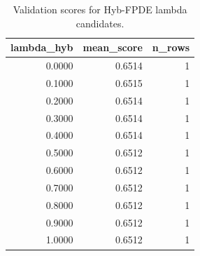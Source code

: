 \begin{table}[t]
\caption{Validation scores for Hyb-FPDE lambda candidates.}
\label{tab:lambda_distribution_computed}
\centering
\begin{tabular}{rrr}
\toprule
lambda\_hyb & mean\_score & n\_rows \\
\midrule
0.0000 & 0.6514 & 1 \\
0.1000 & 0.6515 & 1 \\
0.2000 & 0.6514 & 1 \\
0.3000 & 0.6514 & 1 \\
0.4000 & 0.6514 & 1 \\
0.5000 & 0.6512 & 1 \\
0.6000 & 0.6512 & 1 \\
0.7000 & 0.6512 & 1 \\
0.8000 & 0.6512 & 1 \\
0.9000 & 0.6512 & 1 \\
1.0000 & 0.6512 & 1 \\
\bottomrule
\end{tabular}

\end{table}
